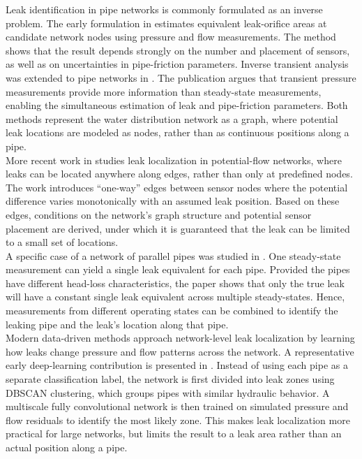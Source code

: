 Leak identification in pipe networks is commonly formulated as an inverse problem. The early formulation in \cite{pudar1992} estimates equivalent leak-orifice areas at candidate network nodes using pressure and flow measurements. The method shows that the result depends strongly on the number and placement of sensors, as well as on uncertainties in pipe-friction parameters. Inverse transient analysis was extended to pipe networks in \cite{liggett1994}. The publication argues that transient pressure measurements provide more information than steady-state measurements, enabling the simultaneous estimation of leak and pipe-friction parameters. Both methods represent the water distribution network as a graph, where potential leak locations are modeled as nodes, rather than as continuous positions along a pipe.\\

More recent work in \cite{molno2024conditions} studies leak localization in potential-flow networks, where leaks can be located anywhere along edges, rather than only at predefined nodes. The work introduces “one-way” edges between sensor nodes where the potential difference varies monotonically with an assumed leak position. Based on these edges, conditions on the network's graph structure and potential sensor placement are derived, under which it is guaranteed that the leak can be limited to a small set of locations.\\

A specific case of a network of parallel pipes was studied in \cite{molno2024parallel}. One steady-state measurement can yield a single leak equivalent for each pipe. Provided the pipes have different head-loss characteristics, the paper shows that only the true leak will have a constant single leak equivalent across multiple steady-states. Hence, measurements from different operating states can be combined to identify the leaking pipe and the leak's location along that pipe.\\

Modern data-driven methods approach network-level leak localization by learning how leaks change pressure and flow patterns across the network. A representative early deep-learning contribution is presented in \cite{hu2021multiscale}. Instead of using each pipe as a separate classification label, the network is first divided into leak zones using DBSCAN clustering, which groups pipes with similar hydraulic behavior. A multiscale fully convolutional network is then trained on simulated pressure and flow residuals to identify the most likely zone. This makes leak localization more practical for large networks, but limits the result to a leak area rather than an actual position along a pipe.\\

